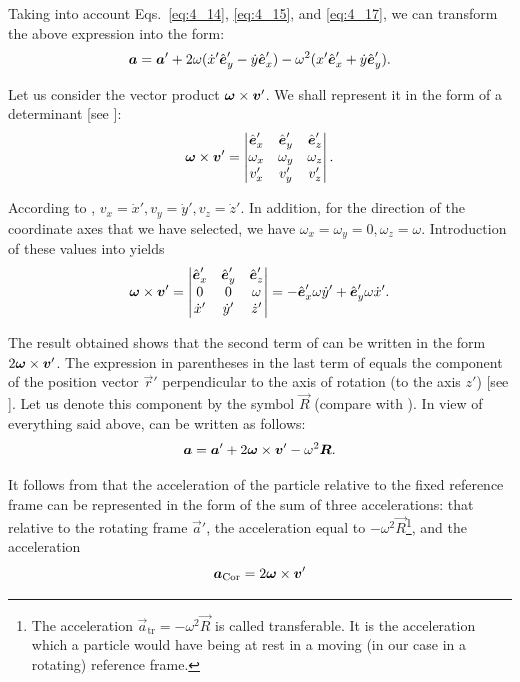 \noindent
Taking into account Eqs.~\eqref{eq:4_14}, \eqref{eq:4_15}, and \eqref{eq:4_17}, we can transform the above expression into the form:
\begin{equation}\label{eq:4_19}
\boldsymbol{a} = \boldsymbol{a}' + 2\omega(\dot{x}'\hat{\boldsymbol{e}}_{y}' - \dot{y}\hat{\boldsymbol{e}}_{x}') - \omega^2(x'\hat{\boldsymbol{e}}_{x}' + \dot{y}\hat{\boldsymbol{e}}_{y}').
\end{equation}

Let us consider the vector product $\boldsymbol{\omega}\times\boldsymbol{v}'$. We shall represent it in the form of a determinant [see ]:
\begin{equation}\label{eq:4_20}
\boldsymbol{\omega}\times\boldsymbol{v}' = \begin{vmatrix}
\hat{\boldsymbol{e}}_{x}' & \hat{\boldsymbol{e}}_{y}' & \hat{\boldsymbol{e}}_{z}'\\
\omega_x & \omega_y & \omega_z\\
v_x' & v_y' & v_z'
\end{vmatrix}.
\end{equation}

\noindent
According to , $v_x=\dot{x}', v_y=\dot{y}', v_z=\dot{z}'$. In addition, for the direction of the coordinate axes that we have selected, we have $\omega_x=\omega_y=0, \omega_z=\omega$. Introduction of these values into  yields
\begin{equation}\label{eq:4_21}
\boldsymbol{\omega}\times\boldsymbol{v}' = \begin{vmatrix}
\hat{\boldsymbol{e}}_{x}' & \hat{\boldsymbol{e}}_{y}' & \hat{\boldsymbol{e}}_{z}'\\
0 & 0 & \omega\\
\dot{x}' & \dot{y}' & \dot{z}'
\end{vmatrix} = -\hat{\boldsymbol{e}}_{x}'\omega\dot{y}' + \hat{\boldsymbol{e}}_{y}'\omega\dot{x}'.
\end{equation}

\noindent
The result obtained shows that the second term of  can be written in the form $2\boldsymbol{\omega}\times\boldsymbol{v}'$. The expression in parentheses in the last term of  equals the component of the position vector $\vec{r}'$ perpendicular to the axis of rotation (to the axis $z'$) [see ]. Let us denote this component by the symbol $\vec{R}$ (compare with ). In view of everything said above,  can be written as follows:
\vspace{-12pt}
\begin{equation}\label{eq:4_22}
\boldsymbol{a} = \boldsymbol{a}' + 2\boldsymbol{\omega}\times\boldsymbol{v}' - \omega^2\boldsymbol{R}.
\end{equation}

It follows from  that the acceleration of the particle relative to the fixed reference frame can be represented in the form of the sum of three accelerations: that relative to the rotating frame $\vec{a}'$, the acceleration equal to $-\omega^2\vec{R}$\footnote{The acceleration $\vec{a}_{\text{tr}}=-\omega^2\vec{R}$ is called transferable. It is the acceleration which a particle would have being at rest in a moving (in our case in a rotating) reference frame.}, and the acceleration
\begin{equation}\label{eq:4_23}
\boldsymbol{a}_{\text{Cor}} = 2\boldsymbol{\omega}\times\boldsymbol{v}'
\end{equation}

